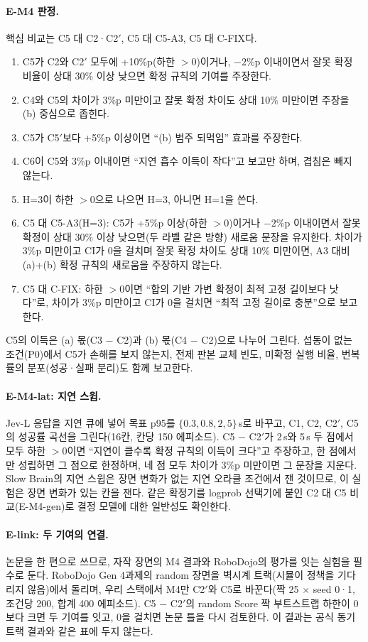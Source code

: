\paragraph{E-M4 판정.}
핵심 비교는 C5 대 C2·C2$'$, C5 대 C5-A3, C5 대 C-FIX다.
\begin{enumerate}
  \item C5가 C2와 C2$'$ 모두에 +10\%p(하한 $>0$)이거나, $-2$\%p 이내이면서 잘못 확정 비율이 상대 30\% 이상 낮으면 확정 규칙의 기여를 주장한다.
  \item C4와 C5의 차이가 3\%p 미만이고 잘못 확정 차이도 상대 10\% 미만이면 주장을 (b) 중심으로 좁힌다.
  \item C5가 C5$'$보다 +5\%p 이상이면 ``(b) 범주 되먹임'' 효과를 주장한다.
  \item C6이 C5와 3\%p 이내이면 ``지연 흡수 이득이 작다''고 보고만 하며, 겹침은 빼지 않는다.
  \item H=3이 하한 $>0$으로 나으면 H=3, 아니면 H=1을 쓴다.
  \item C5 대 C5-A3(H=3): C5가 +5\%p 이상(하한 $>0$)이거나 $-2$\%p 이내이면서 잘못 확정이 상대 30\% 이상 낮으면(두 라벨 같은 방향) 새로움 문장을 유지한다. 차이가 3\%p 미만이고 CI가 0을 걸치며 잘못 확정 차이도 상대 10\% 미만이면, A3 대비 (a)+(b) 확정 규칙의 새로움을 주장하지 않는다.
  \item C5 대 C-FIX: 하한 $>0$이면 ``합의 기반 가변 확정이 최적 고정 길이보다 낫다''로, 차이가 3\%p 미만이고 CI가 0을 걸치면 ``최적 고정 길이로 충분''으로 보고한다.
\end{enumerate}
C5의 이득은 (a) 몫(C3 $-$ C2)과 (b) 몫(C4 $-$ C2)으로 나누어 그린다. 섭동이 없는 조건(P0)에서 C5가 손해를 보지 않는지, 전제 판본 교체 빈도, 미확정 실행 비율, 번복률의 분포(성공·실패 분리)도 함께 보고한다.

\paragraph{E-M4-lat: 지연 스윕.}
Jev-L 응답을 지연 큐에 넣어 목표 p95를 $\{0.3, 0.8, 2, 5\}$\,s로 바꾸고, C1, C2, C2$'$, C5의 성공률 곡선을 그린다(16칸, 칸당 150 에피소드). C5 $-$ C2$'$가 2\,s와 5\,s 두 점에서 모두 하한 $>0$이면 ``지연이 클수록 확정 규칙의 이득이 크다''고 주장하고, 한 점에서만 성립하면 그 점으로 한정하며, 네 점 모두 차이가 3\%p 미만이면 그 문장을 지운다. Slow Brain의 지연 스윕은 장면 변화가 없는 지연 오라클 조건에서 잰 것이므로, 이 실험은 장면 변화가 있는 칸을 잰다. 같은 확정기를 logprob 선택기에 붙인 C2 대 C5 비교(E-M4-gen)로 결정 모델에 대한 일반성도 확인한다.

\paragraph{E-link: 두 기여의 연결.}
논문을 한 편으로 쓰므로, 자작 장면의 M4 결과와 RoboDojo의 평가를 잇는 실험을 필수로 둔다. RoboDojo Gen 4과제의 random 장면을 벽시계 트랙(시뮬이 정책을 기다리지 않음)에서 돌리며, 우리 스택에서 M4만 C2$'$와 C5로 바꾼다(짝 25 $\times$ seed 0·1, 조건당 200, 합계 400 에피소드). C5 $-$ C2$'$의 random Score 짝 부트스트랩 하한이 0보다 크면 두 기여를 잇고, 0을 걸치면 논문 틀을 다시 검토한다. 이 결과는 공식 동기 트랙 결과와 같은 표에 두지 않는다.

